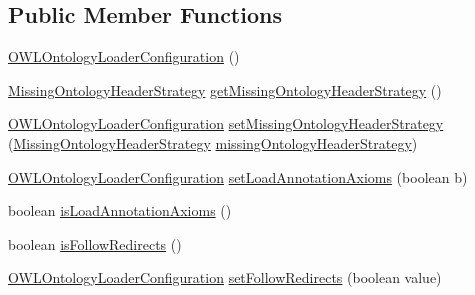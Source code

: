 \subsection*{Public Member Functions}
\begin{DoxyCompactItemize}
\item 
\hyperlink{classorg_1_1semanticweb_1_1owlapi_1_1model_1_1_o_w_l_ontology_loader_configuration_a4b6025be25f128f3d35939b4d8eef872}{O\-W\-L\-Ontology\-Loader\-Configuration} ()
\item 
\hyperlink{enumorg_1_1semanticweb_1_1owlapi_1_1model_1_1_o_w_l_ontology_loader_configuration_1_1_missing_ontology_header_strategy}{Missing\-Ontology\-Header\-Strategy} \hyperlink{classorg_1_1semanticweb_1_1owlapi_1_1model_1_1_o_w_l_ontology_loader_configuration_a9db65be3e1e0648c66b74382959f2ec1}{get\-Missing\-Ontology\-Header\-Strategy} ()
\item 
\hyperlink{classorg_1_1semanticweb_1_1owlapi_1_1model_1_1_o_w_l_ontology_loader_configuration}{O\-W\-L\-Ontology\-Loader\-Configuration} \hyperlink{classorg_1_1semanticweb_1_1owlapi_1_1model_1_1_o_w_l_ontology_loader_configuration_a412b68d2fe9841fa4c86148d661e0da9}{set\-Missing\-Ontology\-Header\-Strategy} (\hyperlink{enumorg_1_1semanticweb_1_1owlapi_1_1model_1_1_o_w_l_ontology_loader_configuration_1_1_missing_ontology_header_strategy}{Missing\-Ontology\-Header\-Strategy} \hyperlink{classorg_1_1semanticweb_1_1owlapi_1_1model_1_1_o_w_l_ontology_loader_configuration_a84e5201747f569e881d0994924b2ee6b}{missing\-Ontology\-Header\-Strategy})
\item 
\hyperlink{classorg_1_1semanticweb_1_1owlapi_1_1model_1_1_o_w_l_ontology_loader_configuration}{O\-W\-L\-Ontology\-Loader\-Configuration} \hyperlink{classorg_1_1semanticweb_1_1owlapi_1_1model_1_1_o_w_l_ontology_loader_configuration_ae944c91b6a036bf696438f0b8ce47638}{set\-Load\-Annotation\-Axioms} (boolean b)
\item 
boolean \hyperlink{classorg_1_1semanticweb_1_1owlapi_1_1model_1_1_o_w_l_ontology_loader_configuration_a9d289af0961ad441c2dc2be8effefd52}{is\-Load\-Annotation\-Axioms} ()
\item 
boolean \hyperlink{classorg_1_1semanticweb_1_1owlapi_1_1model_1_1_o_w_l_ontology_loader_configuration_abc49388597c9991176bd3f03fa44425d}{is\-Follow\-Redirects} ()
\item 
\hyperlink{classorg_1_1semanticweb_1_1owlapi_1_1model_1_1_o_w_l_ontology_loader_configuration}{O\-W\-L\-Ontology\-Loader\-Configuration} \hyperlink{classorg_1_1semanticweb_1_1owlapi_1_1model_1_1_o_w_l_ontology_loader_configuration_adcf6b4447e0a5f004dccd6fcfc6571db}{set\-Follow\-Redirects} (boolean value)

\end{DoxyCompactItemize}

